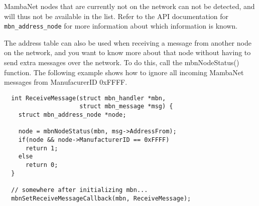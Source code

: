 MambaNet nodes that are currently not on the network can not be detected, and will thus not be available in the list. Refer to the API documentation for \verb|mbn_address_node| for more information about which information is known.

The address table can also be used when receiving a message from another node on the network, and you want to know more about that node without having to send extra messages over the network. To do this, call the mbnNodeStatus() function. The following example shows how to ignore all incoming MambaNet messages from ManufacurerID 0xFFFF.
\begin{verbatim}
  int ReceiveMessage(struct mbn_handler *mbn,
                     struct mbn_message *msg) {
    struct mbn_address_node *node;
    
    node = mbnNodeStatus(mbn, msg->AddressFrom);
    if(node && node->ManufacturerID == 0xFFFF)
      return 1;
    else
      return 0;
  }
  
  // somewhere after initializing mbn...
  mbnSetReceiveMessageCallback(mbn, ReceiveMessage);
\end{verbatim}
